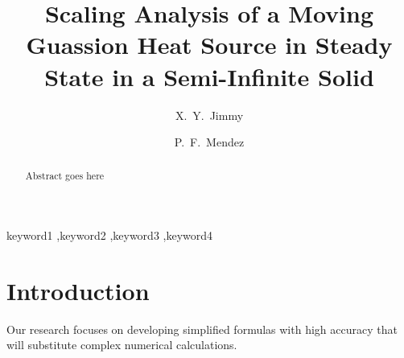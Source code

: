 \documentclass[review, 1p, number, sort&compress,table]{elsarticle}
\begin{document}
	\begin{frontmatter}
		\title{Scaling Analysis of a Moving Guassion Heat Source in Steady State in a Semi-Infinite Solid}
		
		\author[UoA]{X.~Y.~Jimmy}
		
		\author[UoA]{P.~F.~Mendez}
		
		
		\address[UoA]{Department of Chemical and Materials Engineering, University of Alberta, Edmonton, Alberta,T6G 2V4, Canada}
	
		\begin{abstract}
			Abstract goes here
		\end{abstract}
		
		\begin{keyword}
			keyword1 \sep keyword2 \sep keyword3 \sep keyword4
		\end{keyword}

	\end{frontmatter}
	

	\section{Introduction}
		\indent 
		Our research focuses on developing simplified formulas with high accuracy that will substitute complex numerical calculations. 
		      
\end{document}
